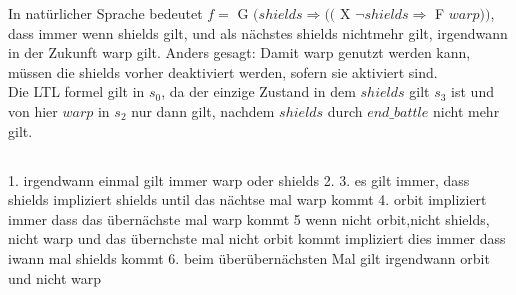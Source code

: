 \documentclass[a4paper,12pt]{scrartcl}
\begin{document}
In natürlicher Sprache bedeutet
$f=$ G $(shields \Rightarrow (($ X $ \neg{shields} \Rightarrow $ F $warp))$,
 dass immer wenn shields gilt, und als nächstes shields nichtmehr gilt, 
irgendwann in der Zukunft warp gilt. Anders gesagt: Damit warp genutzt 
werden kann, müssen die shields vorher deaktiviert werden, sofern sie 
aktiviert sind.\\

Die LTL formel gilt in $s_0$, da der einzige Zustand in dem $shields$ gilt
$s_3$ ist und von hier $warp$ in $s_2$ nur dann gilt, nachdem $shields$ 
durch $end\_battle$ nicht mehr gilt.
\subsubsection{}
\subsection{}
1. irgendwann einmal gilt immer warp oder shields
2.
3. es gilt immer, dass shields impliziert shields until das nächtse mal warp kommt
4. orbit impliziert immer dass das übernächste mal warp kommt
5 wenn nicht orbit,nicht shields, nicht warp und das übernchste mal nicht orbit kommt impliziert dies immer dass iwann mal shields kommt
6. beim überübernächsten Mal gilt irgendwann orbit und nicht warp
%
\end{document}
